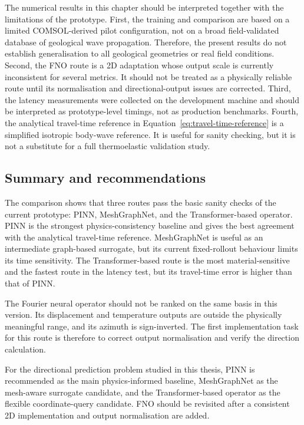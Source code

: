 The numerical results in this chapter should be interpreted together
with the limitations of the prototype. First, the training and
comparison are based on a limited COMSOL-derived pilot configuration,
not on a broad field-validated database of geological wave propagation.
Therefore, the present results do not establish generalisation to all
geological geometries or real field conditions. Second, the FNO route is
a 2D adaptation whose output scale is currently inconsistent for several
metrics. It should not be treated as a physically reliable route until
its normalisation and directional-output issues are corrected. Third,
the latency measurements were collected on the development machine and
should be interpreted as prototype-level timings, not as production
benchmarks. Fourth, the analytical travel-time reference in
Equation~\ref{eq:travel-time-reference} is a simplified isotropic
body-wave reference. It is useful for sanity checking, but it is not a
substitute for a full thermoelastic validation study.

\subsection{Summary and recommendations}

The comparison shows that three routes pass the basic sanity checks of
the current prototype: PINN, MeshGraphNet, and the Transformer-based
operator. PINN is the strongest physics-consistency baseline and gives
the best agreement with the analytical travel-time reference.
MeshGraphNet is useful as an intermediate graph-based surrogate, but its
current fixed-rollout behaviour limits its time sensitivity. The
Transformer-based route is the most material-sensitive and the fastest
route in the latency test, but its travel-time error is higher than that
of PINN.

The Fourier neural operator should not be ranked on the same basis in
this version. Its displacement and temperature outputs are outside the
physically meaningful range, and its azimuth is sign-inverted. The first
implementation task for this route is therefore to correct output
normalisation and verify the direction calculation.

For the directional prediction problem studied in this thesis, PINN is
recommended as the main physics-informed baseline, MeshGraphNet as the
mesh-aware surrogate candidate, and the Transformer-based operator as
the flexible coordinate-query candidate. FNO should be revisited after a
consistent 2D implementation and output normalisation are added.
